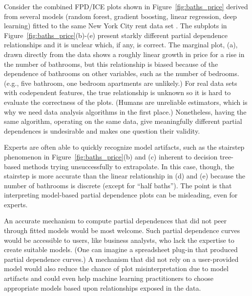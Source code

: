 \documentclass[smallextended]{svjour3}       %
\newcommand{\figref}[1]{Figure~\ref{#1}}
\begin{document}
Consider the combined FPD/ICE plots shown in \figref{fig:baths_price} derived from several models (random forest, gradient boosting, linear regression, deep learning) fitted to the same New York City rent data set \citep{rent}.  The subplots in \figref{fig:baths_price}(b)-(e)  present starkly different partial dependence relationships and it is unclear which, if any, is correct.  The marginal plot, (a), drawn directly from the data shows a roughly linear growth in price for a rise in the number of bathrooms, but this relationship is biased because of the dependence of bathrooms on other variables, such as the number of bedrooms. (e.g., five bathroom, one bedroom apartments are unlikely.)  For real data sets with codependent features, the true relationship is unknown so it is hard to evaluate the correctness of the plots. (Humans are unreliable estimators, which is why we need data analysis algorithms in the first place.) Nonetheless, having the same algorithm, operating on the same data, give meaningfully different partial dependences is undesirable and makes one question their validity.

Experts are often able to quickly recognize model artifacts, such as the  stairstep phenomenon in \figref{fig:baths_price}(b) and (c) inherent to decision tree-based methods trying unsuccessfully to extrapolate.  In this case, though, the stairstep is more accurate than the linear relationship in (d) and (e) because the number of bathrooms is discrete (except for ``half baths'').  The point is that interpreting model-based partial dependence plots can be misleading, even for experts. 

An accurate mechanism to compute partial dependences that did not peer through fitted models would be most welcome.  Such partial dependence curves would be accessible to users, like business analysts, who lack the expertise to create suitable models. (One can imagine a spreadsheet plug-in that produced partial dependence curves.) A mechanism that did not rely on a user-provided model would also reduce the chance of plot misinterpretation due to model artifacts and could even help machine learning practitioners to choose appropriate models based upon relationships exposed in the data.
\end{document}
